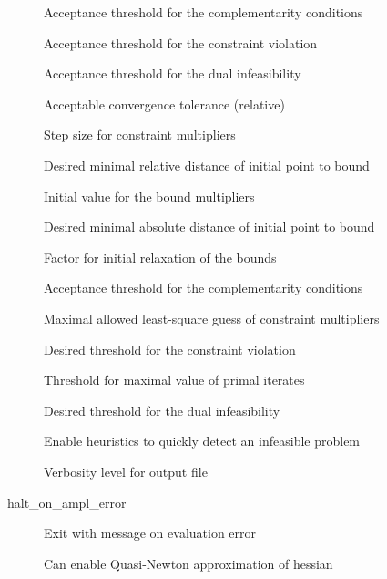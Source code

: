 \begin{description}
\item[{}] Acceptance threshold for the complementarity conditions
\item[{}] Acceptance threshold for the constraint violation
\item[{}] Acceptance threshold for the dual infeasibility
\item[{}] Acceptable convergence tolerance (relative)
\item[{}] Step size for constraint multipliers
\item[{}] Desired minimal relative distance of initial point to bound
\item[{}] Initial value for the bound multipliers
\item[{}] Desired minimal absolute distance of initial point to bound
\item[{}] Factor for initial relaxation of the bounds
\item[{}] Acceptance threshold for the complementarity conditions
\item[{}] Maximal allowed least-square guess of constraint multipliers
\item[{}] Desired threshold for the constraint violation
\item[{}] Threshold for maximal value of primal iterates
\item[{}] Desired threshold for the dual infeasibility
\item[{}] Enable heuristics to quickly detect an infeasible problem
\item[{}] Verbosity level for output file
\item[halt\_on\_ampl\_error] Exit with message on evaluation error
\item[{}] Can enable Quasi-Newton approximation of hessian

\end{description}
